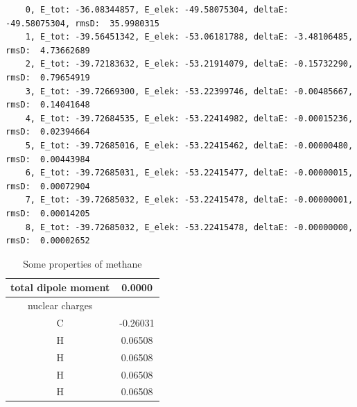 \documentclass[%
    paper=A4,               %
    twoside=true,           %
    openany,              %
    parskip=full,           %
    chapterprefix=true,     %
    11pt,                   %
    headings=normal,        %
    bibliography=totoc,     %
    listof=totoc,           %
    titlepage=on,           %
    captions=tableabove,    %
    draft=false,            %
]{scrreprt}
\numberwithin{equation}{section}
\begin{document}
     \begin{verbatim}
    0, E_tot: -36.08344857, E_elek: -49.58075304, deltaE: -49.58075304, rmsD:  35.9980315
    1, E_tot: -39.56451342, E_elek: -53.06181788, deltaE: -3.48106485, rmsD:  4.73662689
    2, E_tot: -39.72183632, E_elek: -53.21914079, deltaE: -0.15732290, rmsD:  0.79654919
    3, E_tot: -39.72669300, E_elek: -53.22399746, deltaE: -0.00485667, rmsD:  0.14041648
    4, E_tot: -39.72684535, E_elek: -53.22414982, deltaE: -0.00015236, rmsD:  0.02394664
    5, E_tot: -39.72685016, E_elek: -53.22415462, deltaE: -0.00000480, rmsD:  0.00443984
    6, E_tot: -39.72685031, E_elek: -53.22415477, deltaE: -0.00000015, rmsD:  0.00072904
    7, E_tot: -39.72685032, E_elek: -53.22415478, deltaE: -0.00000001, rmsD:  0.00014205
    8, E_tot: -39.72685032, E_elek: -53.22415478, deltaE: -0.00000000, rmsD:  0.00002652
    \end{verbatim}
     
     \begin{table}[ht]
        \centering
        \begin{tabular}{c|c}
             total dipole moment & 0.0000  \\
             \hline
             nuclear charges &  \\ 
             \hline
             C & -0.26031 \\
             H & 0.06508 \\
             H & 0.06508 \\
             H & 0.06508\\
             H & 0.06508 \\
        \end{tabular}
        \caption{Some properties of methane}
        \label{tab:number3}
    \end{table}
    
\end{document}
